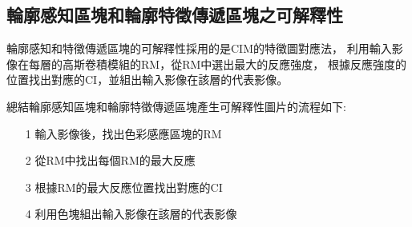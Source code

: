 \documentclass[class=NCU_thesis, crop=false]{standalone}
\begin{document}
	\subsection{輪廓感知區塊和輪廓特徵傳遞區塊之可解釋性}
	輪廓感知和特徵傳遞區塊的可解釋性採用的是CIM的特徵圖對應法，
	利用輸入影像在每層的高斯卷積模組的RM，從RM中選出最大的反應強度，
	根據反應強度的位置找出對應的CI，並組出輸入影像在該層的代表影像。

	總結輪廓感知區塊和輪廓特徵傳遞區塊產生可解釋性圖片的流程如下:
	\begin{itemize}
		\item [1]
		輸入影像後，找出色彩感應區塊的RM
		\item [2]
		從RM中找出每個RM的最大反應
		\item [3]
		根據RM的最大反應位置找出對應的CI
		\item [4]
		利用色塊組出輸入影像在該層的代表影像
	\end{itemize}
\end{document}
